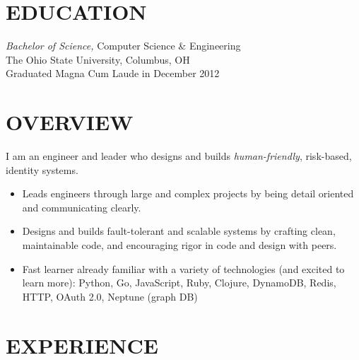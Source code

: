 \documentclass[line,letterpaper]{resume}
\begin{document}
\address{\href{https://www.ryanmcg.com}{Personal website --- https://www.ryanmcg.com}}
\address{\href{mailto:ryan@ryanmcg.com}{ryan@ryanmcg.com}}


\begin{resume}
    \vspace{-24pt}
    \section{\uppercase{Education}} {\sl Bachelor of Science,} \/
    Computer Science \& Engineering \\
    The Ohio State University, Columbus, OH \\
    Graduated Magna Cum Laude in December 2012 \\

    \vspace{-20pt}

    \section{\uppercase{Overview}}
    I am an engineer and leader who designs and builds \emph{human-friendly}, risk-based, identity systems.
    \vspace{6pt}
    \begin{itemize}
        \item Leads engineers through large and complex projects by being detail oriented and communicating clearly.
        \item Designs and builds fault-tolerant and scalable systems by crafting
            clean, maintainable code, and encouraging rigor in code and design
            with peers.
        \item Fast learner already familiar with a variety of technologies (and
            excited to learn more): Python, Go, JavaScript,
            Ruby, Clojure, DynamoDB, Redis, HTTP, OAuth 2.0, Neptune (graph DB)
    \end{itemize}

    \vspace{-6pt}

    \section{\uppercase{Experience}}


\end{resume}
\end{document}
